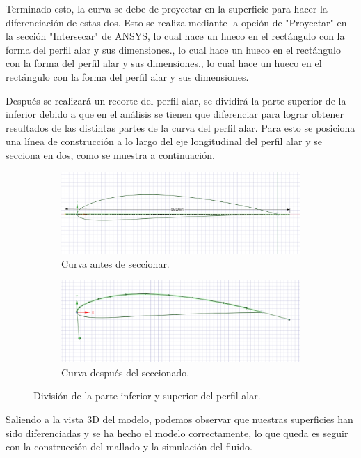 \documentclass[12pt, letterpaper]{article}
\begin{document}
Terminado esto, la curva se debe de proyectar en la superficie para hacer la diferenciación de estas dos. Esto se realiza mediante la opción de "Proyectar" en la sección "Intersecar" de ANSYS, lo cual hace un hueco en el rectángulo con la forma del perfil alar y sus dimensiones., lo cual hace un hueco en el rectángulo con la forma del perfil alar y sus dimensiones., lo cual hace un hueco en el rectángulo con la forma del perfil alar y sus dimensiones.

Después se realizará un recorte del perfil alar, se dividirá la parte superior de la inferior debido a que en el análisis se tienen que diferenciar para lograr obtener resultados de las distintas partes de la curva del perfil alar. Para esto se posiciona una línea de construcción a lo largo del eje longitudinal del perfil alar y se secciona en dos, como se muestra a continuación.

\begin{figure}[H]
	\centering
	\begin{subfigure}[b]{0.49\linewidth}
		\includegraphics[width=\linewidth]{16.png}
		\caption{Curva antes de seccionar.}
	\end{subfigure}
	\begin{subfigure}[b]{0.49\linewidth}
		\includegraphics[width=\linewidth]{18.png}
		\caption{Curva después del seccionado.}
	\end{subfigure}
	\caption{División de la parte inferior y superior del perfil alar.}
\end{figure}


Saliendo a la vista 3D del modelo, podemos observar que nuestras superficies han sido diferenciadas y se ha hecho el modelo correctamente, lo que queda es seguir con la construcción del mallado y la simulación del fluido.
\end{document}
